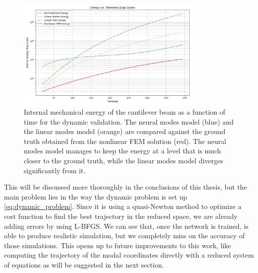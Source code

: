 \begin{figure}[htb]
    \centering
    \includegraphics[width=0.8\textwidth]{Images/beam_dynamic_energy.png}
    \caption{Internal mechanical energy of the cantilever beam as a function of time for the dynamic validation. The neural modes model (blue) and the linear modes model (orange) are compared against the ground truth obtained from the nonlinear FEM solution (red). The neural modes model manages to keep the energy at a level that is much closer to the ground truth, while the linear modes model diverges significantly from it.}
    \label{fig:dynamic_validation_energy_comparison}
    \end{figure}

This will be discussed more thoroughly in the conclusions of this thesis, but the main problem lies in the way the dynamic problem is set up \eqref{eq:dynamic_problem}. Since it is using a quasi-Newton method to optimize a cost function to find the best trajectory in the reduced space, we are already adding errors by using L-BFGS. We can see that, once the network is trained, is able to produce realistic simulation, but we completely miss on the accuracy of those simulations. This opens up to future improvements to this work, like computing the trajectory of the modal coordinates directly with a reduced system of equations as will be suggested in the next section.


\FloatBarrier %